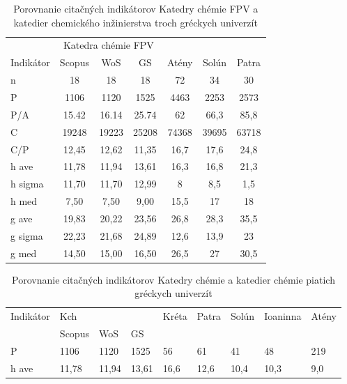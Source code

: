 \begin{SCtable}
  \label{tab:kazakis.results}

  \caption[Porovnanie Katedry chémie a katedier chemického inžinierstva troch gréckych univerzít]
  {Porovnanie citačných indikátorov Katedry chémie FPV a katedier chemického inžinierstva troch gréckych univerzít \citep{Kazakis2015}}
\begin{tabular}{lcccccc}
\toprule\noalign{\vspace{.3ex}}
           & \multicolumn{3}{c}{Katedra chémie FPV} & \multicolumn{3}{c}{\citet{Kazakis2015}}  \\
 Indikátor & Scopus & WoS   & GS    &  Atény     & Solún      & Patra      \\[0.3ex]
\midrule\noalign{\vspace{.5ex}}
 n         & 18     & 18    & 18    & 72    & 34    & 30    \\
 P         & 1106   & 1120  & 1525  & 4463  & 2253  & 2573  \\
 P/A       & 15.42  & 16.14 & 25.74 & 62    & 66,3  & 85,8  \\
 C         & 19248  & 19223 & 25208 & 74368 & 39695 & 63718 \\
 C/P       & 12,45  & 12,62 & 11,35 & 16,7  & 17,6  & 24,8  \\[1ex]
 h ave     & 11,78  & 11,94 & 13,61 & 16,3  & 16,8  & 21,3  \\
 h sigma   & 11,70  & 11,70 & 12,99 & 8     & 8,5   & 1,5   \\
 h med     & 7,50   & 7,50  & 9,00  & 15,5  & 17    & 18    \\
 g ave     & 19,83  & 20,22 & 23,56 & 26,8  & 28,3  & 35,5  \\
 g sigma   & 22,23  & 21,68 & 24,89 & 12,6  & 13,9  & 23    \\
 g med     & 14,50  & 15,00 & 16,50 & 26,5  & 27    & 30,5  \\[0.5ex]
\bottomrule
\end{tabular}
\end{SCtable}

\begin{table}
  \label{tab:lazaridis.results}
  \caption[Porovnanie Katedry chémie a chemických katedier vybraných gréckych univerzít]
  {Porovnanie citačných indikátorov Katedry chémie a katedier chémie piatich gréckych univerzít \citep{Lazaridis2010}}
\begin{tabular}{lllllllll}
\hline
 Indikátor & Kch    &       &       & Kréta & Patra & Solún & Ioaninna & Atény \\
           & Scopus & WoS   & GS    &       &       &       &          &       \\
 P         & 1106   & 1120  & 1525  & 56    & 61    & 41    & 48       & 219   \\
 h ave     & 11,78  & 11,94 & 13,61 & 16,6  & 12,6  & 10,4  & 10,3     & 9,0   \\
\hline
\end{tabular}
\end{table}


